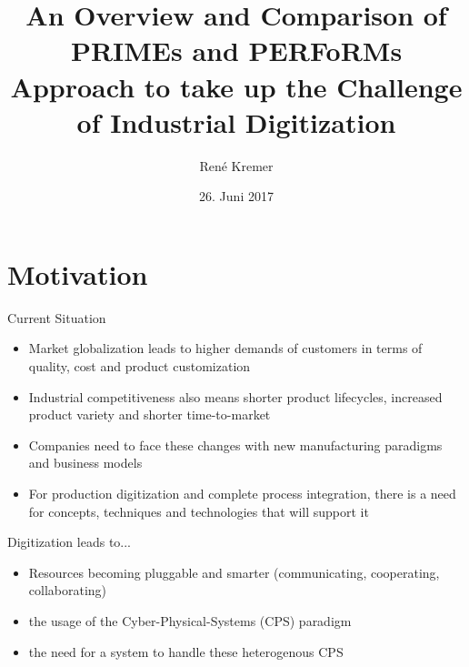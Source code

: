 \documentclass[12pt, xcolor=dvipsnames]{beamer}
\author[René Kremer]{\small René Kremer}
\title[An Overview and Comparison of PRIMEs and PERFoRMs Approach to take up the Challenge of Industrial Digitization]{An Overview and Comparison of PRIMEs and PERFoRMs Approach to take up the Challenge of Industrial Digitization}
\institute{Universität zu Lübeck}
\date{26. Juni 2017}
\begin{document}
\begin{frame}
	\titlepage
\end{frame}



\section{Motivation}

\begin{frame}{Current Situation}
	\begin{itemize}
		\item Market globalization leads to higher demands of customers in terms of quality, cost and product customization
		\newline
		
		\item Industrial competitiveness also means shorter product lifecycles, increased product variety and shorter time-to-market
		\newline
		
		\item Companies need to face these changes with new manufacturing paradigms and business models
		\newline
		
		\item For production digitization and complete process integration, there is a need for concepts, techniques and technologies that will support it
	\end{itemize}
\end{frame}

\begin{frame}{Digitization leads to...}
	\begin{itemize}
		\item Resources becoming pluggable and smarter (communicating, cooperating, collaborating)
		\newline 
		
		\item the usage of the Cyber-Physical-Systems (CPS) paradigm
		\newline
		
		\item the need for a system to handle these heterogenous CPS
	\end{itemize}
\end{frame}
\end{document}
